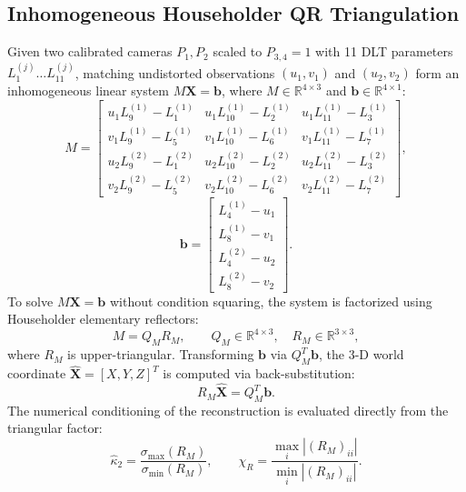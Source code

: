 \documentclass[a4paper,conference]{IEEEtran}
\newcommand{\R}{\mathbb{R}}
\newcommand{\X}{\mathbf{X}}
\newcommand{\kappaTwo}{\widehat{\kappa}_2}
\newcommand{\diagratio}{\chi_R}
\begin{document}
\subsection{Inhomogeneous Householder QR Triangulation}
Given two calibrated cameras $P_1, P_2$ scaled to $P_{3,4} = 1$ with 11 DLT parameters $L_1^{(j)} \dots L_{11}^{(j)}$, matching undistorted observations $(u_1, v_1)$ and $(u_2, v_2)$ form an inhomogeneous linear system $M \X = \mathbf{b}$, where $M \in \R^{4 \times 3}$ and $\mathbf{b} \in \R^{4 \times 1}$:
\begin{equation}
M = \begin{bmatrix}
u_1 L_9^{(1)} - L_1^{(1)} & u_1 L_{10}^{(1)} - L_2^{(1)} & u_1 L_{11}^{(1)} - L_3^{(1)} \\
v_1 L_9^{(1)} - L_5^{(1)} & v_1 L_{10}^{(1)} - L_6^{(1)} & v_1 L_{11}^{(1)} - L_7^{(1)} \\
u_2 L_9^{(2)} - L_1^{(2)} & u_2 L_{10}^{(2)} - L_2^{(2)} & u_2 L_{11}^{(2)} - L_3^{(2)} \\
v_2 L_9^{(2)} - L_5^{(2)} & v_2 L_{10}^{(2)} - L_6^{(2)} & v_2 L_{11}^{(2)} - L_7^{(2)}
\end{bmatrix},
\label{eq:M}
\end{equation}
\begin{equation}
\mathbf{b} = \begin{bmatrix}
L_4^{(1)} - u_1 \\ L_8^{(1)} - v_1 \\ L_4^{(2)} - u_2 \\ L_8^{(2)} - v_2
\end{bmatrix}.
\label{eq:b}
\end{equation}
To solve $M \X = \mathbf{b}$ without condition squaring, the system is factorized using Householder elementary reflectors:
\begin{equation}
M = Q_M R_M, \qquad Q_M \in \R^{4 \times 3}, \quad R_M \in \R^{3 \times 3},
\end{equation}
where $R_M$ is upper-triangular. Transforming $\mathbf{b}$ via $Q_M^T \mathbf{b}$, the 3-D world coordinate $\hat{\X} = [X, Y, Z]^T$ is computed via back-substitution:
\begin{equation}
R_M \hat{\X} = Q_M^T \mathbf{b}.
\label{eq:qrx}
\end{equation}
The numerical conditioning of the reconstruction is evaluated directly from the triangular factor:
\begin{equation}
\kappaTwo = \frac{\sigma_{\max}(R_M)}{\sigma_{\min}(R_M)}, \qquad \diagratio = \frac{\max_i |(R_M)_{ii}|}{\min_i |(R_M)_{ii}|}.
\label{eq:kappam}
\end{equation}
\end{document}

